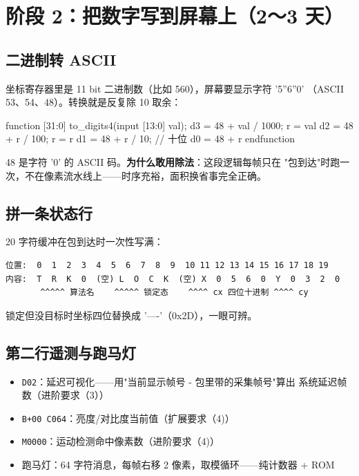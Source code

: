 \documentclass[11pt]{ctexart}
\newcommand{\code}[1]{\texttt{#1}}
\begin{document}
\section{阶段 2：把数字写到屏幕上（2～3 天）}

\subsection{二进制转 ASCII}

坐标寄存器里是 11 bit 二进制数（比如 560），屏幕要显示字符 '5''6''0'
（ASCII 53、54、48）。转换就是反复除 10 取余：

\begin{Verilog}
function [31:0] to_digits4(input [13:0] val);
    d3 = 48 + val / 1000;   r = val %
    d2 = 48 + r / 100;      r = r %
    d1 = 48 + r / 10;                          // 十位
    d0 = 48 + r %
endfunction
\end{Verilog}

48 是字符 '0' 的 ASCII 码。\textbf{为什么敢用除法}：这段逻辑每帧只在
"包到达"时跑一次，不在像素流水线上——时序充裕，面积换省事完全正确。

\subsection{拼一条状态行}

20 字符缓冲在包到达时一次性写满：

\begin{Verbatim}
位置:  0  1  2  3  4  5  6  7  8  9  10 11 12 13 14 15 16 17 18 19
内容:  T  R  K  0  (空) L  O  C  K  (空) X  0  5  6  0  Y  0  3  2  0
       ^^^^^ 算法名    ^^^^^ 锁定态    ^^^^ cx 四位十进制 ^^^^ cy
\end{Verbatim}

锁定但没目标时坐标四位替换成 '----'（0x2D），一眼可辨。

\subsection{第二行遥测与跑马灯}

\begin{itemize}
  \item \code{D02}：延迟可视化——用"当前显示帧号 - 包里带的采集帧号"算出
    系统延迟帧数（进阶要求（3））
  \item \code{B+00 C064}：亮度/对比度当前值（扩展要求（4)）
  \item \code{M0000}：运动检测命中像素数（进阶要求（4)）
  \item 跑马灯：64 字符消息，每帧右移 2 像素，取模循环——纯计数器 + ROM
\end{itemize}
\end{document}
